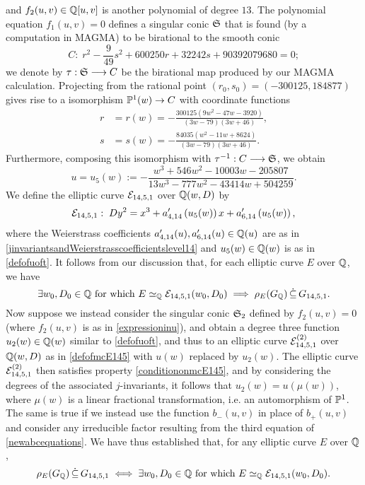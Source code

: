 and $f_2(u,v) \in \mathbb{Q}[u,v]$ is another polynomial of degree $13$. The polynomial equation $f_1(u,v) = 0$ defines a singular conic $\mathfrak{S}$ that is found (by a computation in MAGMA) to be birational to the smooth conic
\[
C : \; r^2 - \frac{9}{49}s^2 + 600250r + 32242s + 90392079680 = 0;
\]
we denote by $\tau : \mathfrak{S} \longrightarrow C$ be the birational map produced by our MAGMA calculation. Projecting from the rational point $(r_0,s_0) = (-300125,184877)$ gives rise to a isomorphism $\mathbb{P}^1(w) \rightarrow C$ with coordinate functions
\[
\begin{split}
r &= r(w) = - \frac{300125(9w^2 - 47w - 3920)}{(3w - 79)(3w + 46)}, \\
s &= s(w) = - \frac{84035(w^2 - 11w + 8624)}{(3w - 79)(3w + 46)}.
\end{split}
\]
Furthermore, composing this isomorphism with $\tau^{-1} : C \longrightarrow \mathfrak{S}$, we obtain
\begin{equation} \label{defofuoft}
u = u_5(w) := - \frac{w^3 + 546w^2 - 10003w - 205807}{13w^3 - 777w^2 - 43414w + 504259}.
\end{equation}
We define the elliptic curve $\mathcal{E}_{14,5,1}$ over $\mathbb{Q}(w,D)$ by
\begin{equation} \label{defofmcE145}
\mathcal{E}_{14,5,1} : \; Dy^2 = x^3 + a_{4,14}'\left( u_5(w) \right) x + a_{6,14}'\left( u_5(w) \right),
\end{equation}
where the Weierstrass coefficients $a_{4,14}'(u), a_{6,14}'(u) \in \mathbb{Q}(u)$ are as in \eqref{jinvariantsandWeierstrasscoefficientslevel14} and $u_5(w) \in \mathbb{Q}(w)$ is as in \eqref{defofuoft}.
It follows from our discussion that, for each elliptic curve $E$ over $\mathbb{Q}$, we have
\begin{equation} \label{conditiononmcE145}
\exists w_0, D_0 \in \mathbb{Q} \text{ for which } E \simeq_{\mathbb{Q}} \mathcal{E}_{14,5,1}(w_0,D_0) \; \Longrightarrow \; \rho_{E}(G_{\mathbb{Q}}) \, \dot\subseteq \, G_{14,5,1}.
\end{equation}
Now suppose we instead consider the singular conic $\mathfrak{S}_2$ defined by $f_2(u,v) = 0$ (where $f_2(u,v)$ is as in \eqref{expressioninu}), and obtain a degree three function $u_2(w) \in \mathbb{Q}(w)$ similar to \eqref{defofuoft}, and thus to an elliptic curve $\mathcal{E}_{14,5,1}^{(2)}$ over $\mathbb{Q}(w,D)$ as in \eqref{defofmcE145} with $u(w)$ replaced by $u_2(w)$. The elliptic curve $\mathcal{E}_{14,5,1}^{(2)}$ then satisfies property \eqref{conditiononmcE145}, and by considering the degrees of the associated $j$-invariants, it follows that $u_2(w) = u(\mu(w))$, where $\mu(w)$ is a linear fractional transformation, i.e. an automorphism of $\mathbb{P}^1$. The same is true if we instead use the function $b_{-}(u,v)$ in place of $b_{+}(u,v)$ and consider any irreducible factor resulting from the third equation of \eqref{newabcequations}. We have thus established that, for any elliptic curve $E$ over $\mathbb{Q}$,
\begin{equation*} 
\rho_{E}(G_{\mathbb{Q}}) \, \dot\subseteq \, G_{14,5,1} \; \Longleftrightarrow \; \exists w_0, D_0 \in \mathbb{Q} \text{ for which } E \simeq_{\mathbb{Q}} \mathcal{E}_{14,5,1}(w_0,D_0).
\end{equation*}

